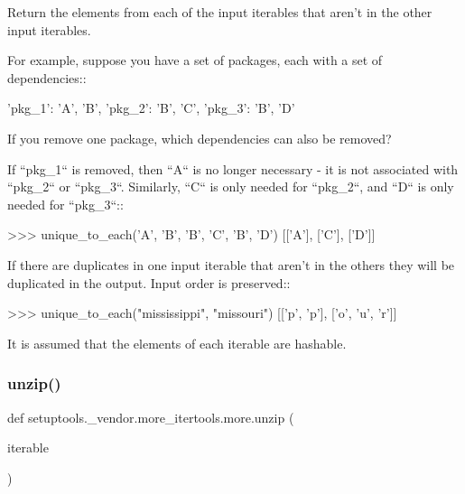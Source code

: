 \begin{DoxyVerb}Return the elements from each of the input iterables that aren't in the
other input iterables.

For example, suppose you have a set of packages, each with a set of
dependencies::

    {'pkg_1': {'A', 'B'}, 'pkg_2': {'B', 'C'}, 'pkg_3': {'B', 'D'}}

If you remove one package, which dependencies can also be removed?

If ``pkg_1`` is removed, then ``A`` is no longer necessary - it is not
associated with ``pkg_2`` or ``pkg_3``. Similarly, ``C`` is only needed for
``pkg_2``, and ``D`` is only needed for ``pkg_3``::

    >>> unique_to_each({'A', 'B'}, {'B', 'C'}, {'B', 'D'})
    [['A'], ['C'], ['D']]

If there are duplicates in one input iterable that aren't in the others
they will be duplicated in the output. Input order is preserved::

    >>> unique_to_each("mississippi", "missouri")
    [['p', 'p'], ['o', 'u', 'r']]

It is assumed that the elements of each iterable are hashable.\end{DoxyVerb}
 \mbox{\label{namespacesetuptools_1_1__vendor_1_1more__itertools_1_1more_a21fdb959c73b5d1418b18a789dd0e138}} 
\subsubsection{\texorpdfstring{unzip()}{unzip()}}
{\footnotesize\ttfamily def setuptools.\+\_\+vendor.\+more\+\_\+itertools.\+more.\+unzip (\begin{DoxyParamCaption}\item[{}]{iterable }\end{DoxyParamCaption})}

